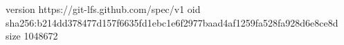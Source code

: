 version https://git-lfs.github.com/spec/v1
oid sha256:b214dd378477d157f6635fd1ebc1e6f2977baad4af1259fa528fa928d6e8ce8d
size 1048672
